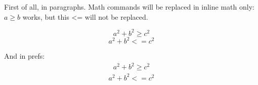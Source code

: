 First of all, in paragraphs. Math commands will be replaced in inline math only: $a \geq b$ works,
but this <= will not be replaced.

\begin{equation}
  a^2 + b^2 \geq c^2
\end{equation}
\begin{equation}
  a^2 + b^2 <= c^2
\end{equation}

And in prefs:
\begin{align}
  a^2 + b^2 \geq c^2
\end{align}
\begin{align}
  a^2 + b^2 <= c^2
\end{align}
